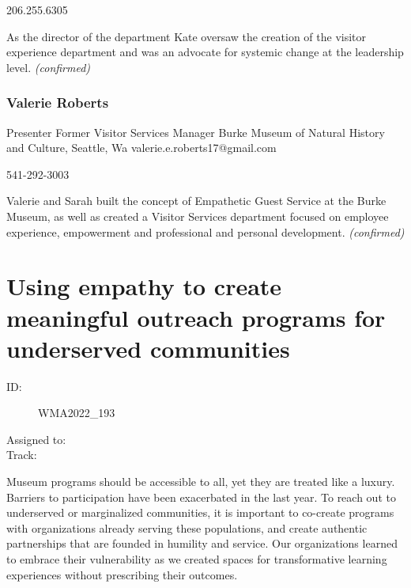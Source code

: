 \documentclass{report}
\begin{document}
                206.255.6305\newline

                As the director of the department Kate oversaw the creation of the visitor experience department and was an advocate for systemic change at the leadership level.\newline
                \emph{ (confirmed) }
              

              
                \subsubsection*{ Valerie Roberts }
                Presenter\newline
                Former Visitor Services Manager\newline
                Burke Museum of Natural History and Culture, Seattle, Wa
                \newline
                valerie.e.roberts17@gmail.com\newline
                
                541-292-3003\newline

                Valerie and Sarah built the concept of Empathetic Guest Service at the Burke Museum, as well as created a Visitor Services department focused on employee experience, empowerment and professional and personal development.
                \emph{ (confirmed) }
              

              

              

              
        
          \newpage
          \section{ Using empathy to create meaningful outreach programs for underserved communities }
            \begin{description}
              \item [ID:]
              WMA2022\_193

              \item [Assigned to:]
                \item [Track:]
              \end{description}

              Museum programs should be accessible to all, yet they are treated like a luxury. Barriers to participation have been exacerbated in the last year. To reach out to underserved or marginalized communities, it is important to co-create programs with organizations already serving these populations, and create authentic partnerships that are founded in humility and service. Our organizations learned to embrace their vulnerability as we created spaces for transformative learning experiences without prescribing their outcomes. 
\end{document}
